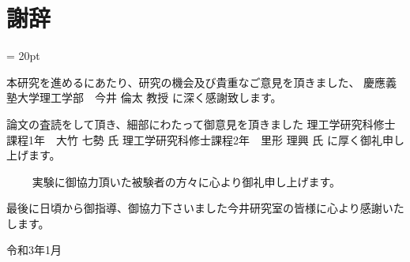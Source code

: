 %
%
\chapter*{謝辞}
\baselineskip = 20pt

\begin{verbatimtab}
	本研究を進めるにあたり、研究の機会及び貴重なご意見を頂きました、
			慶應義塾大学理工学部　今井 倫太 教授
に深く感謝致します。


	論文の査読をして頂き、細部にわたって御意見を頂きました
			理工学研究科修士課程1年　大竹 七勢 氏
			理工学研究科修士課程2年　里形 理興 氏
に厚く御礼申し上げます。

　　
	実験に御協力頂いた被験者の方々に心より御礼申し上げます。



最後に日頃から御指導、御協力下さいました今井研究室の皆様に心より感謝いたします。


							令和3年1月
\end{verbatimtab}
